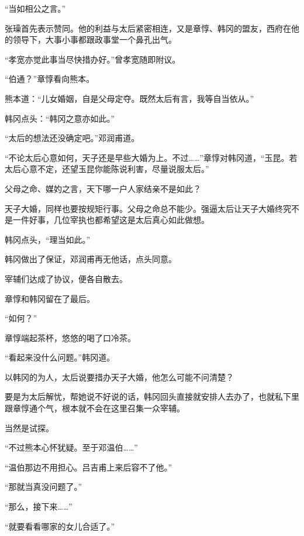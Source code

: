“当如相公之言。”

张璪首先表示赞同。他的利益与太后紧密相连，又是章惇、韩冈的盟友，西府在他的领导下，大事小事都跟政事堂一个鼻孔出气。

“孝宽亦觉此事当尽快措办好。”曾孝宽随即附议。

“伯通？”章惇看向熊本。

熊本道：“儿女婚姻，自是父母定夺。既然太后有言，我等自当依从。”

韩冈点头：“韩冈之意亦如此。”

“太后的想法还没确定吧。”邓润甫道。

“不论太后心意如何，天子还是早些大婚为上。不过……”章惇对韩冈道，“玉昆。若太后心意不定，还望玉昆你能陈说利害，尽量说服太后。”

父母之命、媒妁之言，天下哪一户人家结亲不是如此？

天子大婚，同样也要按规矩行事。父母之命总不能少。强逼太后让天子大婚终究不是一件好事，几位宰执也都希望这是太后真心如此做想。

韩冈点头，“理当如此。”

韩冈做出了保证，邓润甫再无他话，点头同意。

宰辅们达成了协议，便各自散去。

章惇和韩冈留在了最后。

“如何？”

章惇端起茶杯，悠悠的喝了口冷茶。

“看起来没什么问题。”韩冈道。

以韩冈的为人，太后说要措办天子大婚，他怎么可能不问清楚？

要是为太后解忧，帮她说不好说的话，韩冈回头直接就安排人去办了，也就私下里跟章惇通个气，根本就不会在这里召集一众宰辅。

当然是试探。

“不过熊本心怀犹疑。至于邓温伯……”

“温伯那边不用担心。吕吉甫上来后容不了他。”

“那就当真没问题了。”

“那么，接下来……”

“就要看看哪家的女儿合适了。”
